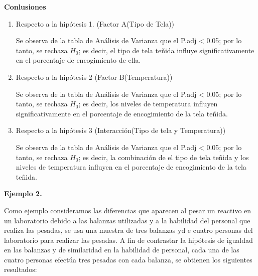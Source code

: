 \documentclass[12pt,letterpaper]{report}
\begin{document}
\textbf{Conlusiones}

\begin{enumerate}

\item {Respecto a la hipótesis 1. (Factor A(Tipo de Tela))}

Se observa de la tabla de Análisis de Varianza que el P.adj < 0.05; por lo tanto,
se rechaza $H_0$; es decir, el tipo de tela teñida influye significativamente en el porcentaje de encogimiento de ella.

\item {Respecto a la hipótesis 2 (Factor B(Temperatura))}

Se observa de la tabla de Análisis de Varianza que el P.adj < 0.05; por lo tanto, se
rechaza $H_0$; es decir, los niveles de temperatura influyen significativamente en el porcentaje de encogimiento de la tela teñida.

\item {Respecto a la hipótesis 3 (Interacción(Tipo de tela y Temperatura))}

Se observa de la tabla de Análisis de Varianza que el P.adj < 0.05; por lo tanto, se
rechaza $H_0$; es decir, la combinación de el tipo de tela teñida y los niveles de temperatura
influyen en el porcentaje de encogimiento de la tela teñida.
\end{enumerate}

\newpage
\textbf{Ejemplo 2.}

Como ejemplo consideramos las diferencias que aparecen al pesar un reactivo en un laboratorio debido a las balanzas utilizadas y a la habilidad del personal que realiza las pesadas, se usa una muestra de tres balanzas yd e cuatro personas del laboratorio para realizar las pesadas. A fin de contrastar la hipótesis de igualdad en las balanzas y de similaridad en la habilidad de personal, cada una de las cuatro personas efectúa tres pesadas con cada balanza, se obtienen los siguientes resultados:
\end{document}
